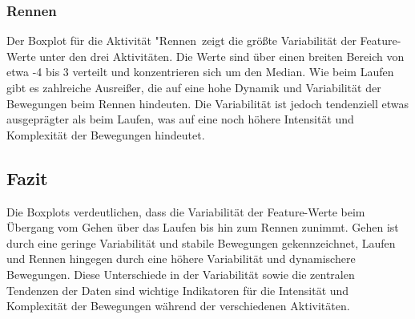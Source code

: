 \subsubsection{Rennen}
Der Boxplot für die Aktivität "Rennen\dq\, zeigt die größte Variabilität der Feature-Werte unter den drei Aktivitäten. Die Werte sind über einen breiten Bereich von etwa -4 bis 3 verteilt und konzentrieren sich um den Median. Wie beim Laufen gibt es zahlreiche Ausreißer, die auf eine hohe Dynamik und Variabilität der Bewegungen beim Rennen hindeuten. Die Variabilität ist jedoch tendenziell etwas ausgeprägter als beim Laufen, was auf eine noch höhere Intensität und Komplexität der Bewegungen hindeutet.

\subsection{Fazit}
Die Boxplots verdeutlichen, dass die Variabilität der Feature-Werte beim Übergang vom Gehen über das Laufen bis hin zum Rennen zunimmt. Gehen ist durch eine geringe Variabilität und stabile Bewegungen gekennzeichnet, Laufen und Rennen hingegen durch eine höhere Variabilität und dynamischere Bewegungen. Diese Unterschiede in der Variabilität sowie die zentralen Tendenzen der Daten sind wichtige Indikatoren für die Intensität und Komplexität der Bewegungen während der verschiedenen Aktivitäten.